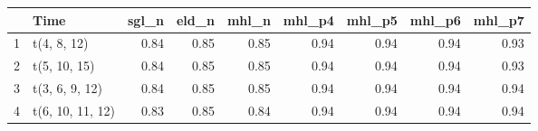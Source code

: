 \begin{table}[ht]
\centering
\begin{tabular}{rlrrrrrrr}
  \hline
 & Time & sgl\_n & eld\_n & mhl\_n & mhl\_p4 & mhl\_p5 & mhl\_p6 & mhl\_p7 \\ 
  \hline
1 & t(4, 8, 12) & 0.84 & 0.85 & 0.85 & 0.94 & 0.94 & 0.94 & 0.93 \\ 
  2 & t(5, 10, 15) & 0.84 & 0.85 & 0.85 & 0.94 & 0.94 & 0.94 & 0.93 \\ 
  3 & t(3, 6, 9, 12) & 0.84 & 0.85 & 0.85 & 0.94 & 0.94 & 0.94 & 0.94 \\ 
  4 & t(6, 10, 11, 12) & 0.83 & 0.85 & 0.84 & 0.94 & 0.94 & 0.94 & 0.94 \\ 
   \hline
\end{tabular}
\end{table}
